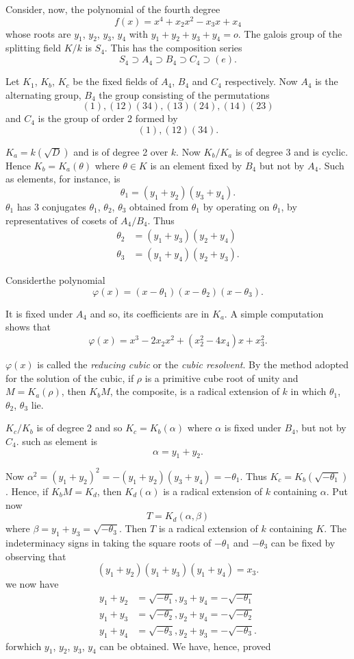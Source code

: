 Consider, now, the polynomial of the fourth degree 
$$
f(x) =x^4 +x_2 x^2 -x_3 x+ x_4
$$   
whose  roots  are $y_1$, $y_2$, $y_3$, $y_4$ with $y_1 +y_2
+y_3+y_4=o$. The galois group of the splitting field $K/k$ is
$S_4$. This has the composition series  
$$
S_4 \supset A_4 \supset B_4 \supset C_4 \supset (e). 
$$ 

Let $K_1$, $K_b$, $K_c$ be the fixed fields of $A_4$, $B_4$ and $C_4$
respectively. Now $A_4$ is the alternating group, $B_4$ the group
consisting of the  permutations 
$$
(1), (12)(34), (13) (24), (14)(23)
$$
and $C_4$ is the group of order 2 formed by 
$$
(1), (12)(34).
$$

$K_a = k(\sqrt{D})$ and is of degree 2 over $k$. Now  $K_b/ K_a$ is
of degree 3 and is cyclic. Hence $K_b= K_a (\theta)$ where $\theta
\in K$ is an  element fixed by $B_4$ but not by $A_4$. Such as
elements, for instance, is  
$$
\theta_1 = (y_1 +y_2) (y_3 +y_4).
$$ 
$\theta_1$ has 3 conjugates $\theta_1$, $\theta_2$, $\theta_3$
obtained  from $\theta_1$ by operating on $\theta_1$, by
representatives of cosets  of $A_4/B_4$. Thus 
\begin{align*}
\theta_2 &= (y_1 +y_3)(y_2+y_4)\\
\theta_3 &= (y_1 +y_4)(y_2+y_3).
 \end{align*} 
 
 Consider\pageoriginale the polynomial
 $$
 \varphi(x)= (x- \theta_1) (x- \theta_2)(x- \theta_3). 
 $$
 
 It is fixed under $A_4$ and so, its coefficients are in $K_a$. A
 simple computation shows that 
 $$
 \varphi(x) =x^3-2 x_2x^2 +(x_2^2- 4 x_4)x+x_3^2.
 $$ 
 
$\varphi(x)$ is called the \textit{reducing  cubic} or the
 \textit{cubic resolvent}. By  the method adopted for the solution  of
 the  cubic, if $\rho$ is a primitive cube root of unity and $M=K_a
 (\rho)$, then  $K_bM$, the composite, is a radical extension of
 $k$ in which $\theta_1$, $\theta_2$, $\theta_3$ lie. 

$K_c/K_b$ is of degree 2 and so $K_c =K_b(\alpha)$ where $\alpha$
 is fixed under $B_4$, but not by $C_4$. such as element is 
$$
\alpha = y_1+y_2.
$$ 

Now $\alpha^2 =(y_1+y_2)^2=-(y_1 +y_2)(y_3 +y_4)=- \theta_1$. Thus
$K_c= K_b (\sqrt{- \theta_1})$. Hence, if $K_bM= K_d$, then
$K_d(\alpha)$ is a radical extension of $k$ containing $\alpha$. Put
now 
$$
T=K_d(\alpha, \beta)
$$
where $\beta= y_1+y_3= \sqrt{- \theta_3}$. Then  $T$ is a radical
extension of $k$ containing $K$. The indeterminacy signs in taking the
square roots of $- \theta_1$ and $- \theta_3$ can be  fixed by
observing that   
$$
(y_1 +y_2)(y_1 + y_3)(y_1+y_4)= x_3.
$$
we now have 
\begin{align*}
y_1 +y_2 &=\sqrt{- \theta_1}, y_3 +y_4 =-\sqrt{- \theta_1} \\
y_1 +y_3 &=\sqrt{- \theta_2}, y_2+y_4 =-\sqrt{- \theta_2} \\
y_1 +y_4 &=\sqrt{- \theta_3}, y_2 +y_3 =-\sqrt{- \theta_3}. 
\end{align*}
for\pageoriginale which $y_1$, $y_2$, $y_3$, $y_4$ can be
obtained. We have, hence, proved  

